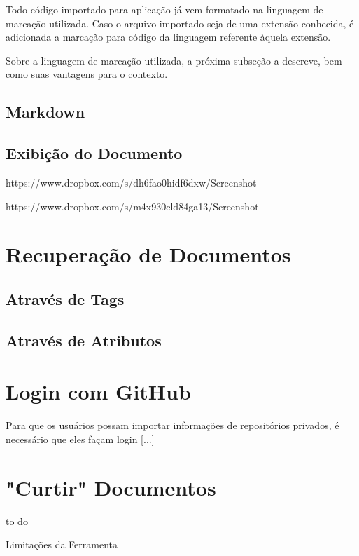 Todo código importado para aplicação já vem formatado na linguagem de marcação utilizada. Caso o arquivo importado seja de uma extensão conhecida, é adicionada a marcação para código da linguagem referente àquela extensão.

Sobre a linguagem de marcação utilizada, a próxima subseção a descreve, bem como suas vantagens para o contexto.

\subsection{Markdown}
\subsection{Exibição do Documento}

https://www.dropbox.com/s/dh6fao0hidf6dxw/Screenshot%

https://www.dropbox.com/s/m4x930cld84ga13/Screenshot%

\section{Recuperação de Documentos}

\subsection{Através de Tags}
\subsection{Através de Atributos}

\section{Login com GitHub}

Para que os usuários possam importar informações de repositórios privados, é necessário que eles façam login [...]

\section{"Curtir" Documentos}

to do

Limitações da Ferramenta

